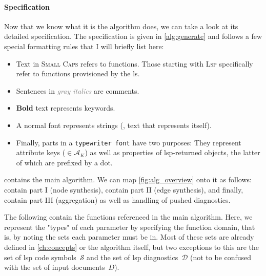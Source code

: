 \documentclass[../thesis]{subfiles}
\begin{document}
\paragraph{Specification}
Now that we know what it is the algorithm does, we can take a look at its detailed specification.
The specification is given in \cref{alg:generate} and follows a few special formatting rules that I will briefly list here:
\begin{itemize}
	\item Text in \textsc{Small Caps} refers to functions.
	      Those starting with \textsc{Lsp} specifically refer to functions provisioned by the \gls{ls}.
	\item Sentences in \textit{\textcolor{gray}{gray italics}} are comments.
	\item \textbf{Bold} text represents keywords.
	\item A normal font represents strings (\ie, text that represents itself).
	\item Finally, parts in a \texttt{typewriter font} have two purposes:
	      They represent attribute keys ($\in \mathcal{A}_K$) as well as properties of \gls{lsp}-returned objects, the latter of which are prefixed by a dot.
\end{itemize}

 contains the main algorithm.
We can map \cref{fig:alg_overview} onto it as follows:
 contain part I (node synthesis),
 contain part II (edge synthesis),
and finally,  contain part III (aggregation) as well as handling of pushed diagnostics.

The following  contain the functions referenced in the main algorithm.
Here, we represent the "types" of each parameter by specifying the function domain, that is, by noting the sets each parameter must be in.
Most of these sets are already defined in \cref{ch:concepts} or the algorithm itself, but two exceptions to this are the set of \gls{lsp} code symbols~$\mathcal{S}$ and the set of \gls{lsp} diagnostics~$\mathcal{D}$ (not to be confused with the set of input documents~$D$).


\end{document}
